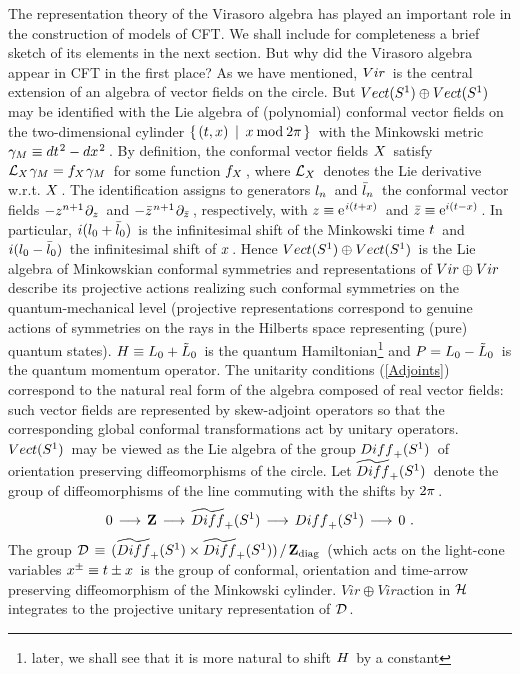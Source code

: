 The representation
theory of the Virasoro algebra has played
an important role in the construction of models of CFT. We shall
include for completeness a brief sketch of its elements in the next
section. But why did the Virasoro algebra
appear in CFT in the first place? As we have
mentioned, \s${Vir}\hspace{0.05cm}$ is the central extension
of an algebra of vector fields
on the circle. But \s${Vect}(S^1)
\oplus{Vect}(S^1)\hspace{0.05cm}$
may be identified with the Lie algebra
of (polynomial) conformal vector fields
on the two-dimensional cylinder \s$\{\s(t,x)\ \s
|\ \s x\s\m{\rm mod}\s\m 2\pi\s\}\s$
with the Minkowski metric
\s${{\gamma}}_M\equiv dt^{\hspace{0.025cm}2}-dx^{\hspace{0.025cm}2}\hspace{0.05cm}$.
By definition, the conformal vector fields
\s$X\hspace{0.05cm}$ satisfy \s${\cal L}_X\hspace{0.025cm} {{\gamma}}_M=f_X\hspace{0.025cm} {{\gamma}}_M\hspace{0.05cm}$ for
some function \s$f_X\hspace{0.05cm}$, \s where \s${\cal L}_X\hspace{0.05cm}$ denotes
the Lie derivative w.r.t. $X\hspace{0.05cm}$. \s The identification
assigns to generators \s$l_n\hspace{0.05cm}$ and \s$\bar l_n\hspace{0.05cm}$
the conformal vector fields \s$-z^{n+1}\hspace{0.025cm}\partial_z\hspace{0.05cm}$
and \s$-{\bar z}^{\hspace{0.025cm} n+1}\hspace{0.025cm}\partial_{\bar z}\hspace{0.05cm}$, \s respectively,
with \s$z\equiv{\rm e}^{\hspace{0.025cm} i(t+x)}\hspace{0.05cm}$ and \s$\bar z\equiv
{\rm e}^{i(t-x)}\hspace{0.05cm}$. \s In particular,
\s$i(l_0+\bar l_0)\hspace{0.05cm}$ is the infinitesimal shift
of the Minkowski time \s$t\hspace{0.05cm}$ and \s$i(l_0-\bar l_0)\hspace{0.05cm}$
the infinitesimal shift of \s$x\hspace{0.05cm}$. \s Hence
\s${Vect}(S^1)\oplus{Vect}(S^1)\hspace{0.05cm}$
is the Lie algebra of Minkowskian conformal symmetries
and representations of \s${Vir}\oplus{Vir}\hspace{0.05cm}$
describe its projective actions realizing such conformal
symmetries on the quantum-mechanical level (projective representations
correspond to genuine actions of symmetries on the
rays in the Hilberts space representing (pure) quantum states).
\s$H\equiv L_0+\tilde L_0\hspace{0.05cm}$
is the quantum Hamiltonian\footnote{later, we shall see that
it is more natural to shift \s$H\hspace{0.05cm}$ by a constant}
and \s$P=L_0-\tilde L_0\hspace{0.05cm}$ is the quantum momentum operator.
The unitarity conditions (\ref{Adjoints}) correspond to the natural
real form of the algebra composed of real vector fields:
such vector fields are represented by skew-adjoint
operators so that the corresponding global conformal
transformations act by unitary operators. \s${Vect}(S^1)
\hspace{0.05cm}$ may be viewed as the Lie algebra of the group
\s${Diff}_+(S^1)\hspace{0.05cm}$ of orientation preserving
diffeomorphisms of the circle. Let \s$\widetilde{Diff}_+
(S^1)\hspace{0.05cm}$ denote the group of diffeomorphisms of the line
commuting with the shifts by \s$2\pi\hspace{0.05cm}$.
$$0\hspace{0.05cm}\longrightarrow\hspace{0.05cm}{{\bf Z}}\hspace{0.05cm}\longrightarrow\hspace{0.05cm}
\widetilde{Diff}_+(S^1)\hspace{0.05cm}\longrightarrow\hspace{0.05cm}
{Diff}_+(S^1)\hspace{0.05cm}\longrightarrow\hspace{0.05cm}0\ .$$
The group \s${\cal D}\hspace{0.05cm}\equiv\hspace{0.05cm}(\widetilde{Diff}_+
(S^1)\times\widetilde{Diff}_+
(S^1))\hspace{0.05cm}/\hspace{0.05cm}{{\bf Z}}_{\rm diag}\hspace{0.05cm}$ (which acts
on the light-cone variables \s$x^\pm\equiv t\pm x\hspace{0.05cm}$
is the group of conformal,
orientation and time-arrow preserving diffeomorphism
of the Minkowski cylinder. \s$Vir\oplus Vir$\s action
in \s${\cal H}\hspace{0.05cm}$ integrates to the projective
unitary representation of \s${\cal D}\hspace{0.05cm}$.
\vs 0.6cm


